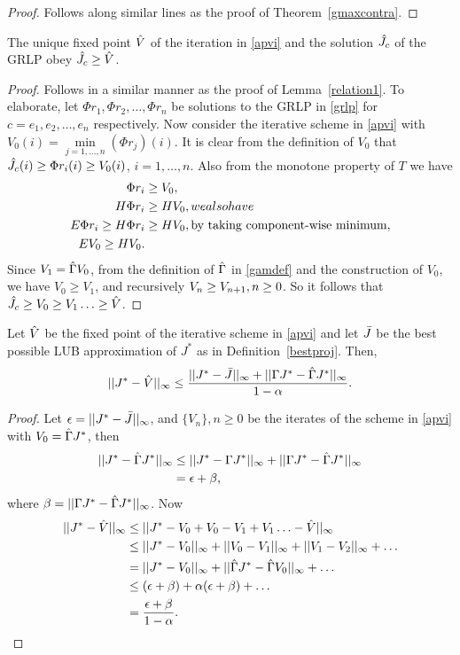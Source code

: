\begin{proof}
Follows along similar lines as the proof of Theorem~\ref{gmaxcontra}.
\end{proof}
\begin{lemma}\label{relation2}
The unique fixed point $\hat{V}$ of the iteration in \eqref{apvi} and the solution $\hat{J}_c$ of the GRLP obey $\hat{J}_c\geq\hat{V}$.
\end{lemma}
\begin{proof}
Follows in a similar manner as the proof of Lemma~\ref{relation1}. To elaborate, let $\Phi r_1, \Phi r_2,\ldots,\Phi r_n$ be solutions to the GRLP in \eqref{grlp} for $c=e_1, e_2,\ldots,e_n$ respectively. Now consider the iterative scheme in \eqref{apvi} with $V_0(i)=\underset{j=1,\ldots,n}{\min}(\Phi r_j)(i)$. It is clear from the definition of $V_0$ that $\hat{J}_c(i)\geq\Phi r_i(i)\geq V_0(i)$, $i=1,\ldots,n$. Also from the monotone property of $T$ we have 
\begin{align}
\Phi r_i&\geq V_0,\nonumber\\
H\Phi r_i&\geq H V_0,\relax{we also have}\nonumber\\
E\Phi r_i\geq H\Phi r_i&\geq HV_0,\relax{ }\text{by taking component-wise minimum},\nonumber\\
E V_0\geq H V_0.
\end{align}
Since $V_1=\hat{\Gamma} V_0$, from the definition of $\hat{\Gamma}$ in \eqref{gamdef} and the construction of $V_0$, we have $V_0\geq V_1$, and recursively $V_{n}\geq V_{n+1}, \relax{ } n\geq 0$. So it follows that $\hat{J}_c\geq V_0\geq V_1\ldots\geq \hat{V}$.
\end{proof}
\begin{theorem}\label{mt1}
Let $\hat{V}$ be the fixed point of the iterative scheme in \eqref{apvi} and let $\bar{J}$ be the best possible LUB approximation of $J^*$ as in Definition~\ref{bestproj}. Then,
\begin{align}
||J^*-\hat{V}||_\infty\leq \frac{||J^*-\bar{J}||_\infty+||\Gamma J^*-\hat{\Gamma} J^*||_\infty}{1-\alpha}.
\end{align}
\end{theorem}
\begin{proof}
Let $\epsilon=||J^*-\bar{J}||_\infty$, and $\{V_n\},n\geq 0$ be the iterates of the scheme in \eqref{apvi} with $V_0=\hat{\Gamma} J^*$, then
\begin{align}
||J^*-\hat{\Gamma} J^*||_\infty&\leq||J^*-\Gamma J^*||_\infty+||\Gamma J^*-\hat{\Gamma} J^*||_\infty\nonumber\\
&= \epsilon+\beta,
\end{align}
where $\beta=||\Gamma J^*-\hat{\Gamma} J^*||_\infty$. Now
\begin{align}
||J^*-\hat{V}||_\infty&\leq ||J^*-V_0+V_0-V_1+V_1\ldots-\hat{V}||_\infty\nonumber\\
&\leq ||J^*-V_0||_\infty+||V_0-V_1||_\infty+||V_1-V_2||_\infty+\ldots\nonumber\\
&=||J^*-V_0||_\infty+||\hat{\Gamma} J^*-\hat{\Gamma} V_0||_\infty+\ldots\nonumber\\
&\leq (\epsilon+\beta)+\alpha(\epsilon+\beta)+\ldots\nonumber\\
&=\frac{\epsilon+\beta}{1-\alpha}.
\end{align}
\end{proof}

